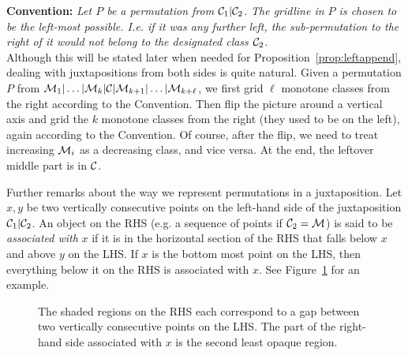 \documentclass[12pt, a4paper, twoside]{report}
\begin{document}
\noindent\textbf{Convention:} \emph{Let $P$ be a permutation from $\mathcal{C}_1|\mathcal{C}_2$. The gridline in $P$ is chosen to be the left-most possible. I.e. if it was any further left, the sub-permutation to the right of it would not belong to the designated class $\mathcal{C}_2$.} \ \\

Although this will be stated later when needed for Proposition~\ref{prop:leftappend}, dealing with juxtapositions from both sides is quite natural. Given a permutation $P$ from $\mathcal{M}_1|\ldots|\mathcal{M}_k|\mathcal{C}|\mathcal{M}_{k+1}|\ldots|\mathcal{M}_{k+\ell}$, we first grid $\ell$ monotone classes from the right according to the Convention. Then flip the picture around a vertical axis and grid the $k$ monotone classes from the right (they used to be on the left), again according to the Convention. Of course, after the flip, we need to treat increasing $\mathcal{M}_i$ as a decreasing class, and vice versa. At the end, the leftover middle part is in $\mathcal{C}$. 

Further remarks about the way we represent permutations in a juxtaposition. Let $x,y$ be two vertically consecutive points on the left-hand side of the juxtaposition $\mathcal{C}_1|\mathcal{C}_2$. An object on the RHS (e.g. a sequence of points if $\mathcal{C}_2 = \mathcal{M}$) is said to be \emph{associated with} $x$ if it is in the horizontal section of the RHS that falls below $x$ and above $y$ on the LHS. If $x$ is the bottom most point on the LHS, then everything below it on the RHS is associated with $x$. See Figure~\ref{fig:xregion} for an example.
\begin{figure}[ht]
  \centering
  \caption{The shaded regions on the RHS each correspond to a gap between two vertically consecutive points on the LHS. The part of the right-hand side associated with $x$ is the second least opaque region.}
  \label{fig:xregion}
\end{figure}
\end{document}
